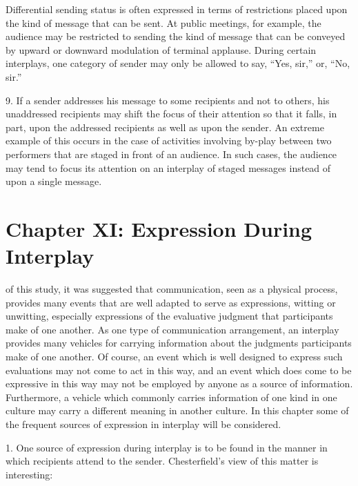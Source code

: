 \documentclass[twoside,symmetric,nobib,justified]{tufte-book}
\let\oldchapter\chapter
\def\chapter{%
  \setcounter{footnote}{0}%
  \oldchapter
}
\begin{document}
Differential sending status is often expressed in terms of restrictions
placed upon the kind of message that can be sent. At public meetings,
for example, the audience may be restricted to sending the kind of
message that can be conveyed by upward or downward modulation of
terminal applause. During certain interplays, one category of sender may
only be allowed to say, ``Yes, sir,'' or, ``No, sir.''

9. If a sender addresses his message to some recipients and not to
others, his unaddressed recipients may shift the focus of their
attention so that it falls, in part, upon the addressed recipients as
well as upon the sender. An extreme example of this occurs in the case
of activities involving by-play between two performers that are staged
in front of an audience. In such cases, the audience may tend to focus
its attention on an interplay of staged messages instead of upon a
single message.

\newpage
\thispagestyle{plain} %
\mbox{}


    
\chapter[CHAPTER XI: EXPRESSION DURING INTERPLAY]{Chapter XI: Expression During\\Interplay}
\label{ch:Chapter XI: Expression During Interplay}



 of this study, it was suggested that communication,
seen as a physical process, provides many events that are well adapted
to serve as expressions, witting or unwitting, especially expressions of
the evaluative judgment that participants make of one another. As one
type of communication arrangement, an interplay provides many vehicles
for carrying information about the judgments participants make of one
another. Of course, an event which is well designed to express such
evaluations may not come to act in this way, and an event which does
come to be expressive in this way may not be employed by anyone as a
source of information. Furthermore, a vehicle which commonly carries
information of one kind in one culture may carry a different meaning in
another culture. In this chapter some of the frequent sources of
expression in interplay will be considered.

1. One source of expression during interplay is to be
found in the manner in which recipients attend to the sender.
Chesterfield's view of this matter is interesting:
\end{document}
